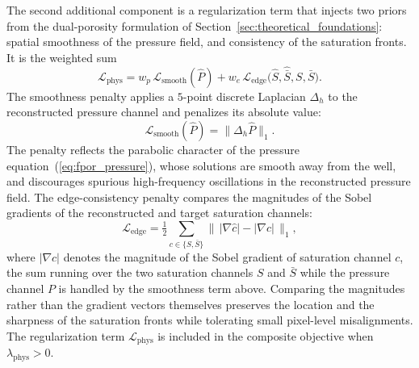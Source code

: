 The second additional component is a regularization term that injects two priors from the dual-porosity formulation of Section~\ref{sec:theoretical_foundations}: spatial smoothness of the pressure field, and consistency of the saturation fronts. It is the weighted sum
\begin{equation}
    \mathcal{L}_{\mathrm{phys}} = w_{p} \, \mathcal{L}_{\mathrm{smooth}}(\widehat{P}) + w_{e} \, \mathcal{L}_{\mathrm{edge}}\!\bigl(\widehat{S}, \widehat{\bar{S}}, S, \bar{S}\bigr).
    \label{eq:loss_phys}
\end{equation}
The smoothness penalty applies a $5$-point discrete Laplacian $\Delta_h$ to the reconstructed pressure channel and penalizes its absolute value:
\begin{equation}
    \mathcal{L}_{\mathrm{smooth}}(\widehat{P}) = \bigl\| \Delta_h \widehat{P} \bigr\|_{1}.
    \label{eq:loss_smooth}
\end{equation}
The penalty reflects the parabolic character of the pressure equation~(\ref{eq:fpor_pressure}), whose solutions are smooth away from the well, and discourages spurious high-frequency oscillations in the reconstructed pressure field. The edge-consistency penalty compares the magnitudes of the Sobel gradients of the reconstructed and target saturation channels:
\begin{equation}
    \mathcal{L}_{\mathrm{edge}} = \tfrac{1}{2} \sum_{c \in \{S, \bar{S}\}} \bigl\| \, |\nabla \widehat{c}| - |\nabla c| \, \bigr\|_{1},
    \label{eq:loss_edge}
\end{equation}
where $|\nabla c|$ denotes the magnitude of the Sobel gradient of saturation channel $c$, the sum running over the two saturation channels $S$ and $\bar{S}$ while the pressure channel $P$ is handled by the smoothness term above. Comparing the magnitudes rather than the gradient vectors themselves preserves the location and the sharpness of the saturation fronts while tolerating small pixel-level misalignments. The regularization term $\mathcal{L}_{\mathrm{phys}}$ is included in the composite objective when $\lambda_{\mathrm{phys}} > 0$.

